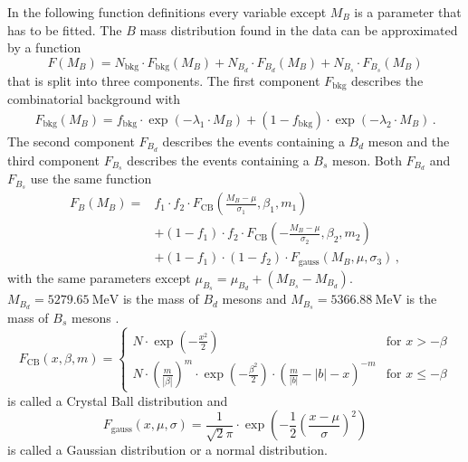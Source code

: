 In the following function definitions every variable except $M_B$ is a parameter that has to be fitted.
The $B$ mass distribution found in the data can be approximated by a function
\begin{equation*}
    F(M_B) = N_\text{bkg} \cdot F_\text{bkg}(M_B) + N_{B_d} \cdot F_{B_d}(M_B) + N_{B_s} \cdot F_{B_s}(M_B)
\end{equation*}
that is split into three components.
The first component $F_\text{bkg}$ describes the combinatorial background with 
\begin{align*}
    F_\text{bkg}(M_B) = f_\text{bkg} \cdot \exp(-\lambda_1 \cdot M_B) + (1-f_\text{bkg}) \cdot \exp(-\lambda_2 \cdot M_B) \, .
\end{align*}
The second component $F_{B_d}$ describes the events containing a $B_d$ meson and the third component $F_{B_s}$ describes the events containing a $B_s$ meson.
Both $F_{B_d}$ and $F_{B_s}$ use the same function
\begin{align*}
    F_B(M_B) = &f_1 \cdot f_2 \cdot F_\text{CB}\left(\frac{M_B-\mu}{\sigma_1}, \beta_1, m_1\right) \\
                    &+ (1-f_1) \cdot f_2 \cdot F_\text{CB}\left(-\frac{M_B-\mu}{\sigma_2}, \beta_2, m_2\right) \\
                    &+ (1-f_1) \cdot (1-f_2) \cdot F_\text{gauss}\left(M_B,\mu,\sigma_3\right) \, ,
\end{align*}
with the same parameters except $\mu_{B_s} = \mu_{B_d} + (M_{B_s}-M_{B_d})$.
$M_{B_d}=\qty{5279.65}{\MeV}$ is the mass of $B_d$ mesons and $M_{B_s}=\qty{5366.88}{\MeV}$ is the mass of $B_s$ mesons \cite{pdg}.
\begin{equation*}
    F_\text{CB}(x,\beta,m) = 
     \begin{cases}
         N \cdot \exp(-\frac{x^2}{2}) & \text{for } x > -\beta \\
         N \cdot \left(\frac{m}{|\beta|}\right)^m \cdot \exp\left(-\frac{\beta^2}{2}\right) \cdot \left(\frac{m}{|b|}-|b| - x\right)^{-m} & \text{for } x \leq -\beta
     \end{cases}
\end{equation*}
is called a Crystal Ball distribution and
\begin{equation*}
    F_\text{gauss}\left(x,\mu,\sigma\right) = \frac{1}{\sqrt{2}\pi} \cdot \exp\left(-\frac{1}{2}\left(\frac{x-\mu}{\sigma}\right)^2\right)
\end{equation*}
is called a Gaussian distribution or a normal distribution.

